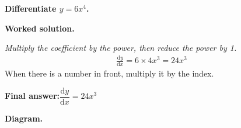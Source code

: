\documentclass[11pt]{article}
\newcommand{\question}[1]{\par\medskip\noindent\textbf{#1}\par}
\begin{document}
\question{Differentiate \( y = 6x^4 \).}

\textbf{Worked solution.}

\textit{Multiply the coefficient by the power, then reduce the power by 1.}
\[\begin{gathered}
\frac{\mathrm{d}y}{\mathrm{d}x} = 6 \times 4x^3 = 24x^3
\end{gathered}\]
When there is a number in front, multiply it by the index.

\begin{answerbox}
\textbf{Final answer:}\quad \(\displaystyle  \dfrac{\mathrm{d}y}{\mathrm{d}x} = 24x^3 \)
\end{answerbox}
\textbf{Diagram.}

\begin{center}
\end{center}
\end{document}
